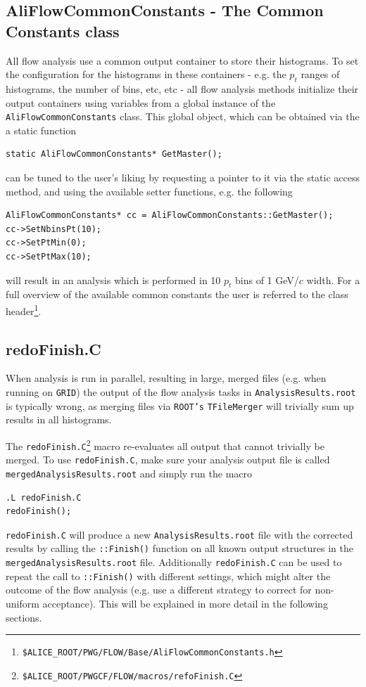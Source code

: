 \documentclass[a5paper]{book}
\numberwithin{equation}{subsection}
\begin{document}
\subsection{AliFlowCommonConstants - The Common Constants class}
All flow analysis use a common output container to store their histograms. To set the configuration for the histograms in these containers - e.g. the $p_t$ ranges of histograms, the number of bins, etc, etc - all flow analysis methods initialize their output containers using variables from a global instance of the \texttt{AliFlowCommonConstants} class. This global object, which can be obtained via the a static function
\begin{lstlisting}
static AliFlowCommonConstants* GetMaster(); \end{lstlisting} 
can be tuned to the  user's liking by requesting a pointer to it via the static access method, and using the available setter functions, e.g. the following
\begin{lstlisting}
AliFlowCommonConstants* cc = AliFlowCommonConstants::GetMaster();
cc->SetNbinsPt(10);
cc->SetPtMin(0);
cc->SetPtMax(10); \end{lstlisting}
will result in an analysis which is performed in 10 $p_t$ bins of 1 GeV/$c$ width. For a full overview of the available common constants the user is referred to the class header\footnote{\texttt{\$ALICE\_ROOT/PWG/FLOW/Base/AliFlowCommonConstants.h}}.


\subsection{redoFinish.C}
 When analysis is run in parallel, resulting in large, merged files (e.g. when running on \texttt{GRID}) the output of the flow analysis tasks in \texttt{AnalysisResults.root} is typically wrong, as merging files via \texttt{ROOT's} \texttt{TFileMerger} will trivially sum up results in all histograms. 

The \texttt{redoFinish.C}\footnote{\texttt{\$ALICE\_ROOT/PWGCF/FLOW/macros/refoFinish.C}} macro re-evaluates all output that cannot trivially be merged. To use \texttt{redoFinish.C}, make sure your analysis output file is called \texttt{mergedAnalysisResults.root} and simply run the macro
\begin{lstlisting}
.L redoFinish.C
redoFinish(); \end{lstlisting}
\texttt{redoFinish.C} will produce a new \texttt{AnalysisResults.root} file with the corrected results by calling the \texttt{::Finish()} function on all known output structures in the \texttt{mergedAnalysisResults.root} file. Additionally \texttt{redoFinish.C} can be used to repeat the call to \texttt{::Finish()} with different settings, which might alter the outcome of the flow analysis (e.g. use a different strategy to correct for non-uniform acceptance). This will be explained in more detail in the following sections. 
\end{document}

